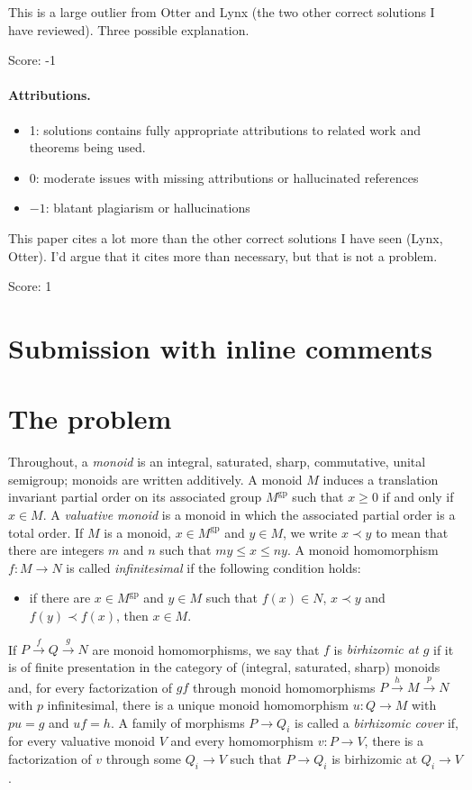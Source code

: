 \documentclass[11pt]{article}
\theoremstyle{definition}
\theoremstyle{remark}
\newcommand{\gp}{\mathrm{gp}}
\begin{document}
This is a large outlier from Otter and Lynx (the two other correct solutions I have reviewed). Three possible explanation.

\noindent Score: -1

\paragraph{Attributions.}
\begin{itemize}
	\item  1: solutions contains fully appropriate attributions
		to related work and theorems being used.
	\item  0: moderate issues with missing attributions or hallucinated references
	\item  $-1$: blatant plagiarism or hallucinations
\end{itemize}

This paper cites a lot more than the other correct solutions I have seen (Lynx, Otter). I'd argue that it cites more than necessary, but that is not a problem.


\noindent Score: 1

\newpage
\section{Submission with inline comments}


\section{The problem}

Throughout, a \emph{monoid} is an integral, saturated, sharp, commutative, unital semigroup; monoids are written additively. A monoid $M$ induces a translation invariant partial order on its associated group $M^{\gp}$ such that $x\ge 0$ if and only if $x\in M$. A \emph{valuative monoid} is a monoid in which the associated partial order is a total order. If $M$ is a monoid, $x\in M^{\gp}$ and $y\in M$, we write $x\prec y$ to mean that there are integers $m$ and $n$ such that $my\le x\le ny$. A monoid homomorphism $f\colon M\to N$ is called \emph{infinitesimal} if the following condition holds:
\begin{itemize}
\item if there are $x\in M^{\gp}$ and $y\in M$ such that $f(x)\in N$, $x\prec y$ and $f(y)\prec f(x)$, then $x\in M$.
\end{itemize}
If $P\xrightarrow{f}Q\xrightarrow{g}N$ are monoid homomorphisms, we say that $f$ is \emph{birhizomic at $g$} if it is of finite presentation in the category of (integral, saturated, sharp) monoids and, for every factorization of $gf$ through monoid homomorphisms $P\xrightarrow{h}M\xrightarrow{p}N$ with $p$ infinitesimal, there is a unique monoid homomorphism $u\colon Q\to M$ with $pu=g$ and $uf=h$. A family of morphisms $P\to Q_i$ is called a \emph{birhizomic cover} if, for every valuative monoid $V$ and every homomorphism $v\colon P\to V$, there is a factorization of $v$ through some $Q_i\to V$ such that $P\to Q_i$ is birhizomic at $Q_i\to V$.
\end{document}
